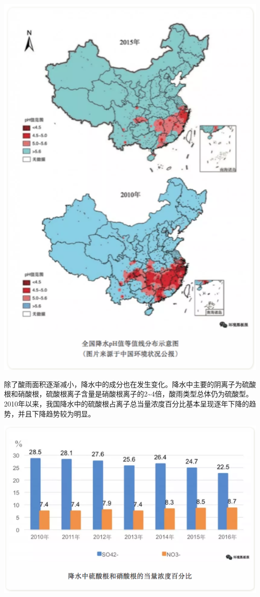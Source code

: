 \documentclass[]{book}
\begin{document}
\includegraphics[width=5.74in]{images/acidrain2}

除了酸雨面积逐渐减小，降水中的成分也在发生变化。降水中主要的阴离子为硫酸根和硝酸根，硫酸根离子含量是硝酸根离子的2\textasciitilde{}4倍，酸雨类型总体仍为硫酸型。2010年以来，我国降水中的硫酸根占离子总当量浓度百分比基本呈现逐年下降的趋势，并且下降趋势较为明显。

\includegraphics[width=8.33in]{images/acidrain3}
\end{document}
